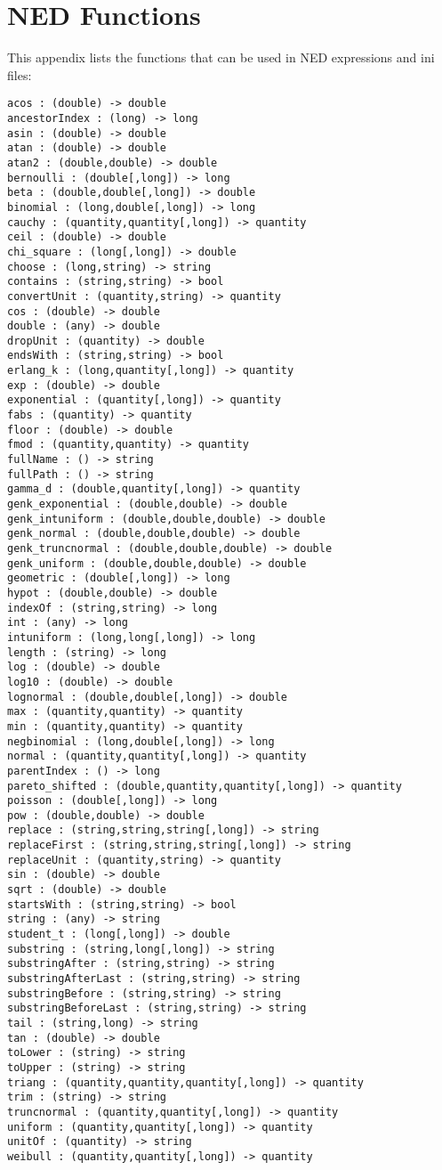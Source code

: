 \chapter{NED Functions}
\label{cha:ned-functions}

This appendix lists the functions that can be used in NED
expressions and ini files:


\begin{verbatim}
acos : (double) -> double
ancestorIndex : (long) -> long
asin : (double) -> double
atan : (double) -> double
atan2 : (double,double) -> double
bernoulli : (double[,long]) -> long
beta : (double,double[,long]) -> double
binomial : (long,double[,long]) -> long
cauchy : (quantity,quantity[,long]) -> quantity
ceil : (double) -> double
chi_square : (long[,long]) -> double
choose : (long,string) -> string
contains : (string,string) -> bool
convertUnit : (quantity,string) -> quantity
cos : (double) -> double
double : (any) -> double
dropUnit : (quantity) -> double
endsWith : (string,string) -> bool
erlang_k : (long,quantity[,long]) -> quantity
exp : (double) -> double
exponential : (quantity[,long]) -> quantity
fabs : (quantity) -> quantity
floor : (double) -> double
fmod : (quantity,quantity) -> quantity
fullName : () -> string
fullPath : () -> string
gamma_d : (double,quantity[,long]) -> quantity
genk_exponential : (double,double) -> double
genk_intuniform : (double,double,double) -> double
genk_normal : (double,double,double) -> double
genk_truncnormal : (double,double,double) -> double
genk_uniform : (double,double,double) -> double
geometric : (double[,long]) -> long
hypot : (double,double) -> double
indexOf : (string,string) -> long
int : (any) -> long
intuniform : (long,long[,long]) -> long
length : (string) -> long
log : (double) -> double
log10 : (double) -> double
lognormal : (double,double[,long]) -> double
max : (quantity,quantity) -> quantity
min : (quantity,quantity) -> quantity
negbinomial : (long,double[,long]) -> long
normal : (quantity,quantity[,long]) -> quantity
parentIndex : () -> long
pareto_shifted : (double,quantity,quantity[,long]) -> quantity
poisson : (double[,long]) -> long
pow : (double,double) -> double
replace : (string,string,string[,long]) -> string
replaceFirst : (string,string,string[,long]) -> string
replaceUnit : (quantity,string) -> quantity
sin : (double) -> double
sqrt : (double) -> double
startsWith : (string,string) -> bool
string : (any) -> string
student_t : (long[,long]) -> double
substring : (string,long[,long]) -> string
substringAfter : (string,string) -> string
substringAfterLast : (string,string) -> string
substringBefore : (string,string) -> string
substringBeforeLast : (string,string) -> string
tail : (string,long) -> string
tan : (double) -> double
toLower : (string) -> string
toUpper : (string) -> string
triang : (quantity,quantity,quantity[,long]) -> quantity
trim : (string) -> string
truncnormal : (quantity,quantity[,long]) -> quantity
uniform : (quantity,quantity[,long]) -> quantity
unitOf : (quantity) -> string
weibull : (quantity,quantity[,long]) -> quantity
\end{verbatim}

